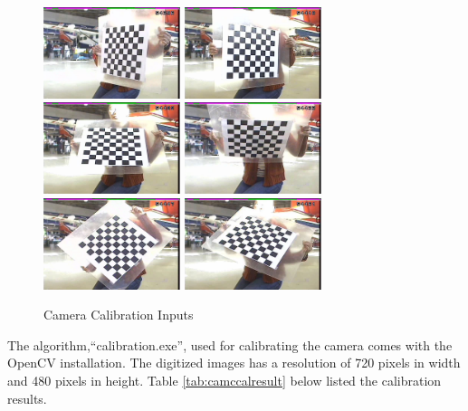 \begin{figure}
  \centering
  \includegraphics[width=4cm,keepaspectratio=true]{./Figures/camcal/camcal1_130.jpeg}
  \includegraphics[width=4cm,keepaspectratio=true]{./Figures/camcal/camcal1_140.jpeg}
  \includegraphics[width=4cm,keepaspectratio=true]{./Figures/camcal/camcal1_160.jpeg}
  \includegraphics[width=4cm,keepaspectratio=true]{./Figures/camcal/camcal1_180.jpeg}
  \includegraphics[width=4cm,keepaspectratio=true]{./Figures/camcal/camcal1_210.jpeg}
  \includegraphics[width=4cm,keepaspectratio=true]{./Figures/camcal/camcal1_240.jpeg}
  \caption{Camera Calibration Inputs}
  \label{fig:camcal}
\end{figure}

The algorithm,``calibration.exe'', used for calibrating the camera
comes with the OpenCV installation. The digitized images has a
resolution of 720 pixels in width and 480 pixels in height. Table
\ref{tab:camccalresult} below listed the calibration results.

